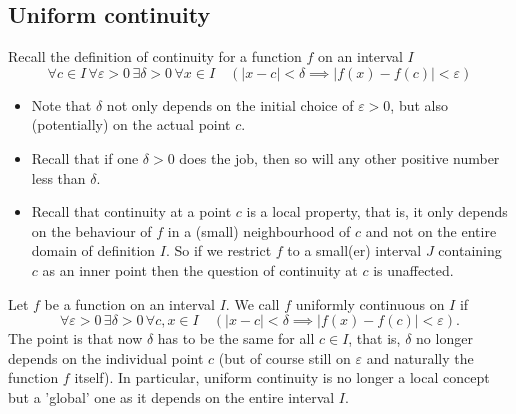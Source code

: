 \documentclass[10pt, a4paper]{article}
\begin{document}
\subsection{Uniform continuity}
Recall the definition of continuity for a function $f$ on an interval $I$
\[
\forall c \in I\, \forall \varepsilon > 0\, \exists\delta > 0\, \forall x \in I\quad (|x - c| < \delta \implies |f(x) - f(c)| < \varepsilon)
\]

\begin{remark}\phantom{}
    \begin{itemize}
        \item Note that $\delta$ not only depends on the initial choice of $\varepsilon > 0$,
        but also
        (potentially)
        on the actual point $c$.
        \item Recall that if one $\delta > 0$ does the job,
        then so will any other positive number less than $\delta$.
        \item Recall that continuity at a point $c$ is a local property,
        that is,
        it only depends on the behaviour of $f$ in a
        (small)
        neighbourhood of $c$ and not on the entire domain of definition $I$.
        So if we restrict $f$ to a small(er) interval $J$ containing $c$ as an inner point then the question of continuity at $c$ is unaffected.
    \end{itemize}
\end{remark}

\begin{definition}
    Let $f$ be a function on an interval $I$.
    We call $f$ uniformly continuous on $I$  if
    \[
    \forall \varepsilon > 0\,\exists \delta > 0\,\forall c, x \in I \quad (|x - c| < \delta \implies |f(x) - f(c)| < \varepsilon).
    \]
    The point is that now $\delta$ has to be the same for all $c \in I$,
    that is,
    $\delta$ no longer depends on the individual point $c$
    (but of course still on $\varepsilon$ and naturally the function $f$ itself).
    In particular,
    uniform continuity is no longer a local concept but a 'global' one as it depends on the entire interval $I$.
\end{definition}
\end{document}
